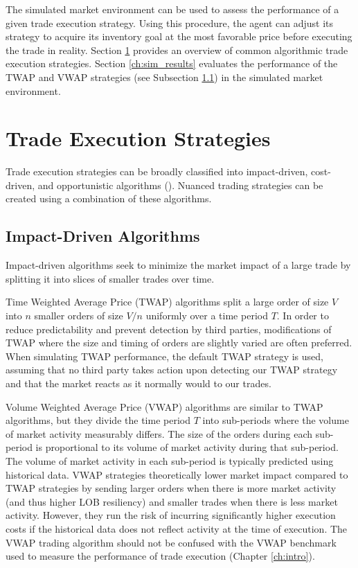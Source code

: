 The simulated market environment can be used to assess the performance of a given trade execution strategy. Using this procedure, the agent can adjust its strategy to acquire its inventory goal at the most favorable price before executing the trade in reality. Section \ref{ch:strategies} provides an overview of common algorithmic trade execution strategies. Section \ref{ch:sim_results} evaluates the performance of the TWAP and VWAP strategies (see Subsection \ref{ch:impact-driven}) in the simulated market environment.

\section{Trade Execution Strategies} \label{ch:strategies}
Trade execution strategies can be broadly classified into impact-driven, cost-driven, and opportunistic algorithms (\cite{labadie:hal-00590283}). Nuanced trading strategies can be created using a combination of these algorithms.

\subsection{Impact-Driven Algorithms} \label{ch:impact-driven}
Impact-driven algorithms seek to minimize the market impact of a large trade by splitting it into slices of smaller trades over time. 

Time Weighted Average Price (TWAP) algorithms split a large order of size $V$ into $n$ smaller orders of size $V/n$ uniformly over a time period $T$. In order to reduce predictability and prevent detection by third parties, modifications of TWAP where the size and timing of orders are slightly varied are often preferred. When simulating TWAP performance, the default TWAP strategy is used, assuming that no third party takes action upon detecting our TWAP strategy and that the market reacts as it normally would to our trades.

Volume Weighted Average Price (VWAP) algorithms are similar to TWAP algorithms, but they divide the time period $T$ into sub-periods where the volume of market activity measurably differs. The size of the orders during each sub-period is proportional to its volume of market activity during that sub-period. The volume of market activity in each sub-period is typically predicted using historical data. VWAP strategies theoretically lower market impact compared to TWAP strategies by sending larger orders when there is more market activity (and thus higher LOB resiliency) and smaller trades when there is less market activity. However, they run the risk of incurring significantly higher execution costs if the historical data does not reflect activity at the time of execution. The VWAP trading algorithm should not be confused with the VWAP benchmark used to measure the performance of trade execution (Chapter \ref{ch:intro}).

